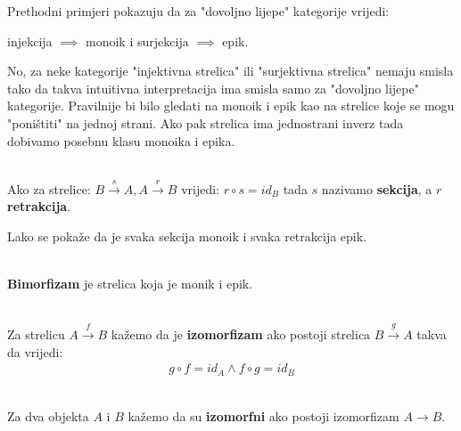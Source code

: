     Prethodni primjeri pokazuju da za "dovoljno lijepe" kategorije vrijedi:
    \begin{center}
      injekcija $\implies$ monoik \qquad i \qquad surjekcija $\implies$ epik.
    \end{center}
    No, za neke kategorije "injektivna strelica" ili "surjektivna strelica"
    nemaju smisla tako da takva intuitivna interpretacija ima smisla samo za
    "dovoljno lijepe" kategorije. Pravilnije bi bilo gledati na monoik i epik
    kao na strelice koje se mogu "poništiti" na jednoj strani. Ako pak strelica
    ima jednostrani inverz tada dobivamo posebnu klasu monoika i epika.\\
    
    \begin{definition}\ \\
    
      \noindent Ako za strelice:
       $B \xrightarrow{s} A, A \xrightarrow{r} B$
      vrijedi:
       $r \circ s = id_B$
      tada $s$ nazivamo \textbf{sekcija}, a $r$ \textbf{retrakcija}.
    \end{definition}
    
    Lako se pokaže da je svaka sekcija monoik i svaka retrakcija epik.
    
    \begin{definition}\ \\
    
    \noindent \textbf{Bimorfizam} je strelica koja je monik i epik.\\
    \end{definition}
    
    \begin{definition}\ \\
    
    \noindent Za strelicu $A \xrightarrow{f} B$ kažemo da je \textbf{izomorfizam} ako
    postoji strelica $B \xrightarrow{g} A$ takva da vrijedi:
      \begin{align*}
        g \circ f = id_A \wedge f \circ g = id_B
      \end{align*}
    \end{definition}
    
    \begin{definition}\ \\
    
    \noindent Za dva objekta $A$ i $B$ kažemo da su \textbf{izomorfni} ako postoji izomorfizam
    $A \xrightarrow{} B$.\\
    \end{definition}

